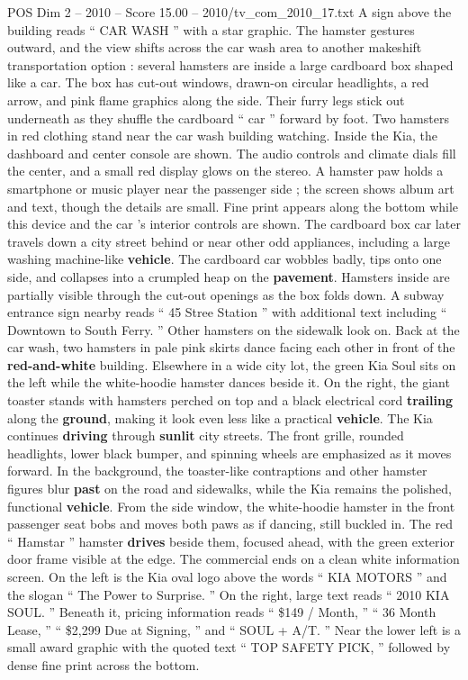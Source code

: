 \begin{textsample}{POS Dim 2 – 2010 – Score 15.00 – 2010/tv\_com\_2010\_17.txt}
A sign above the building reads “ CAR WASH ” with a star graphic.
The hamster gestures outward, and the view shifts across the car wash area to another makeshift transportation option : several hamsters are inside a large cardboard box shaped like a car.
The box has cut-out windows, drawn-on circular headlights, a red arrow, and pink flame graphics along the side.
Their furry legs stick out underneath as they shuffle the cardboard “ car ” forward by foot.
Two hamsters in red clothing stand near the car wash building watching.
Inside the Kia, the dashboard and center console are shown.
The audio controls and climate dials fill the center, and a small red display glows on the stereo.
A hamster paw holds a smartphone or music player near the passenger side ; the screen shows album art and text, though the details are small.
Fine print appears along the bottom while this device and the car ’s interior controls are shown.
The cardboard box car later travels down a city street behind or near other odd appliances, including a large washing machine-like \textbf{vehicle}.
The cardboard car wobbles badly, tips onto one side, and collapses into a crumpled heap on the \textbf{pavement}.
Hamsters inside are partially visible through the cut-out openings as the box folds down.
A subway entrance sign nearby reads “ 45 Stree Station ” with additional text including “ Downtown to South Ferry. ” Other hamsters on the sidewalk look on.
Back at the car wash, two hamsters in pale pink skirts dance facing each other in front of the \textbf{red-and-white} building.
Elsewhere in a wide city lot, the green Kia Soul sits on the left while the white-hoodie hamster dances beside it.
On the right, the giant toaster stands with hamsters perched on top and a black electrical cord \textbf{trailing} along the \textbf{ground}, making it look even less like a practical \textbf{vehicle}.
The Kia continues \textbf{driving} through \textbf{sunlit} city streets.
The front grille, rounded headlights, lower black bumper, and spinning wheels are emphasized as it moves forward.
In the background, the toaster-like contraptions and other hamster figures blur \textbf{past} on the road and sidewalks, while the Kia remains the polished, functional \textbf{vehicle}.
From the side window, the white-hoodie hamster in the front passenger seat bobs and moves both paws as if dancing, still buckled in.
The red “ Hamstar ” hamster \textbf{drives} beside them, focused ahead, with the green exterior door frame visible at the edge.
The commercial ends on a clean white information screen.
On the left is the Kia oval logo above the words “ KIA MOTORS ” and the slogan “ The Power to Surprise. ” On the right, large text reads “ 2010 KIA SOUL. ” Beneath it, pricing information reads “ \$149 / Month, ” “ 36 Month Lease, ” “ \$2,299 Due at Signing, ” and “ SOUL + A/T. ” Near the lower left is a small award graphic with the quoted text “ TOP SAFETY PICK, ” followed by dense fine print across the bottom.

\end{textsample}
